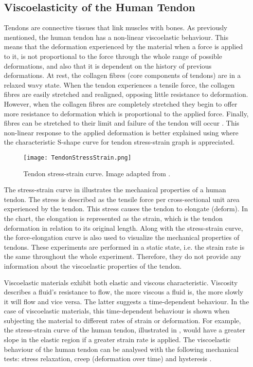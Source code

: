 \subsection{Viscoelasticity of the Human Tendon} \label{sec:viscoelasticity}

Tendons are connective tissues that link muscles with bones. As previously mentioned, the human tendon has a non-linear viscoelastic behaviour. This means that the deformation experienced by the material when a force is applied to it, is not proportional to the force through the whole range of possible deformations, and also that it is dependent on the history of previous deformations. At rest, the collagen fibres (core components of tendons) are in a relaxed wavy state. When the tendon experiences a tensile force, the collagen fibres are easily stretched and realigned, opposing little resistance to deformation. However, when the collagen fibres are completely stretched they begin to offer more resistance to deformation which is proportional to the applied force. Finally, fibres can be stretched to their limit and failure of the tendon will occur \cite{nordin2001basic}. This non-linear response to the applied deformation is better explained using  where the characteristic S-shape curve for tendon stress-strain graph is appreciated.

\begin{figure}[htb!]
    \centering
    \texttt{[image: TendonStressStrain.png]}
    \caption{Tendon stress-strain curve. Image adapted from \cite{maurel1998biomechanical}. }
    \label{fig:tendonSS}
\end{figure}

The stress-strain curve in  illustrates the mechanical properties of a human tendon. The stress is described as the tensile force per cross-sectional unit area experienced by the tendon. This stress causes the tendon to elongate (deform). In the chart, the elongation is represented as the strain, which is the tendon deformation in relation to its original length. Along with the stress-strain curve, the force-elongation curve is also used to visualize the mechanical properties of tendons. These experiments are performed in a static state, i.e. the strain rate is the same throughout the whole experiment. Therefore, they do not provide any information about the viscoelastic properties of the tendon.

Viscoelastic materials exhibit both elastic and viscous characteristic. Viscosity describes a fluid's resistance to flow, the more viscous a fluid is, the more slowly it will flow and vice versa. The latter suggests a time-dependent behaviour. In the case of viscoelastic materials, this time-dependent behaviour is shown when subjecting the material to different rates of strain or deformation. For example, the stress-strain curve of the human tendon, illustrated in , would have a greater slope in the elastic region if a greater strain rate is applied. The viscoelastic behaviour of the human tendon can be analysed with the following mechanical tests: stress relaxation, creep (deformation over time) and hysteresis \cite{nordin2001basic}.

